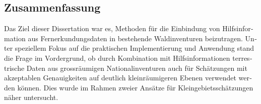 \begin{otherlanguage}{ngerman}
\chapter*{Zusammenfassung}
\label{chap:Zusammenfassung}

Das Ziel dieser Dissertation war es, Methoden für die Einbindung von Hilfsinformation aus Fernerkundungsdaten in bestehende Waldinventuren beizutragen. Unter speziellem Fokus auf die praktischen Implementierung und Anwendung stand die Frage im Vordergrund, ob durch Kombination mit Hilfsinformationen terrestrische Daten aus grossräumigen Nationalinventuren auch für Schätzungen mit akzeptablen Genauigkeiten auf deutlich kleinräumigeren Ebenen verwendet werden können. Dies wurde im Rahmen zweier Ansätze für Kleingebietsschätzungen näher untersucht.\par


\end{otherlanguage}
